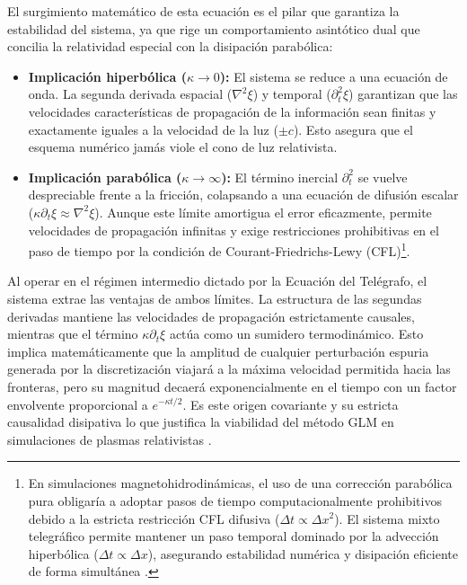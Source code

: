 El surgimiento matemático de esta ecuación es el pilar que garantiza la estabilidad del sistema, ya que rige un comportamiento asintótico dual que concilia la relatividad especial con la disipación parabólica:
\begin{itemize}
    \item \textbf{Implicación hiperbólica ($\kappa \rightarrow 0$):} El sistema se reduce a una ecuación de onda. La segunda derivada espacial ($\nabla^2 \xi$) y temporal ($\partial_t^2 \xi$) garantizan que las velocidades características de propagación de la información sean finitas y exactamente iguales a la velocidad de la luz ($\pm c$). Esto asegura que el esquema numérico jamás viole el cono de luz relativista.
    \item \textbf{Implicación parabólica ($\kappa \rightarrow \infty$):} El término inercial $\partial_t^2$ se vuelve despreciable frente a la fricción, colapsando a una ecuación de difusión escalar ($\kappa \partial_t \xi \approx \nabla^2 \xi$). Aunque este límite amortigua el error eficazmente, permite velocidades de propagación infinitas y exige restricciones prohibitivas en el paso de tiempo por la condición de Courant-Friedrichs-Lewy (CFL)\footnote{En simulaciones magnetohidrodinámicas, el uso de una corrección parabólica pura obligaría a adoptar pasos de tiempo computacionalmente prohibitivos debido a la estricta restricción CFL difusiva ($\Delta t \propto \Delta x^2$). El sistema mixto telegráfico permite mantener un paso temporal dominado por la advección hiperbólica ($\Delta t \propto \Delta x$), asegurando estabilidad numérica y disipación eficiente de forma simultánea \parencite{gomes2015}.}.
\end{itemize}

Al operar en el régimen intermedio dictado por la Ecuación del Telégrafo, el sistema extrae las ventajas de ambos límites. La estructura de las segundas derivadas mantiene las velocidades de propagación estrictamente causales, mientras que el término $\kappa \partial_t \xi$ actúa como un sumidero termodinámico. Esto implica matemáticamente que la amplitud de cualquier perturbación espuria generada por la discretización viajará a la máxima velocidad permitida hacia las fronteras, pero su magnitud decaerá exponencialmente en el tiempo con un factor envolvente proporcional a $e^{-\kappa t / 2}$. Es este origen covariante y su estricta causalidad disipativa lo que justifica la viabilidad del método GLM en simulaciones de plasmas relativistas \parencite{munz2000, Dedner_etal:2002}.

